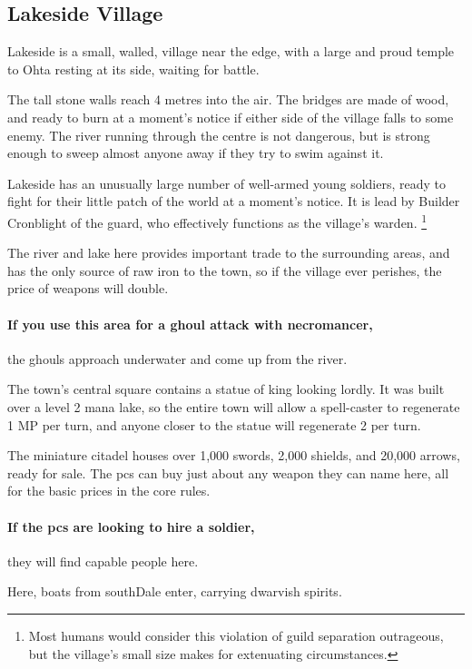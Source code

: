 \subsection{Lakeside Village}
\label{lakeside}


Lakeside is a small, walled, village near the \gls{edge}, with a large and proud temple to Ohta resting at its side, waiting for battle.

The tall stone walls reach 4 metres into the air.
The bridges are made of wood, and ready to burn at a moment's notice if either side of the village falls to some enemy.
The river running through the centre is not dangerous, but is strong enough to sweep almost anyone away if they try to swim against it.

Lakeside has an unusually large number of well-armed young soldiers, ready to fight for their little patch of the world at a moment's notice.
It is lead by Builder Cronblight of the \gls{guard}, who effectively functions as the \gls{village}'s \gls{warden}.%
\footnote{Most humans would consider this violation of guild separation outrageous, but the \gls{village}'s small size makes for extenuating circumstances.}

The river and lake here provides important trade to the surrounding areas, and has the only source of raw iron to the town, so if the \gls{village} ever perishes, the price of weapons will double.

\paragraph{If you use this area for a ghoul attack with \gls{necromancer},}
the ghouls approach underwater and come up from the river.


The town's central square contains a statue of \gls{king} looking lordly.
It was built over a level 2 mana lake, so the entire town will allow a spell-caster to regenerate 1 MP per turn, and anyone closer to the statue will regenerate 2 per turn.


The miniature citadel houses over 1,000 swords, 2,000 shields, and 20,000 arrows, ready for sale.
The \glspl{pc} can buy just about any weapon they can name here, all for the basic prices in the core rules.

\paragraph{If the \glspl{pc} are looking to hire a soldier,}
they will find capable people here.


Here, boats from \gls{southDale} enter, carrying dwarvish spirits.

